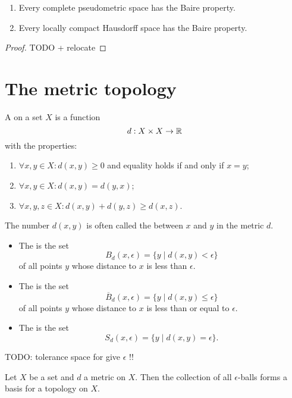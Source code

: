 \begin{theorem} \label{BaireCategory} \hspace{1em}
\begin{enumerate}
\item Every complete pseudometric space has the Baire property.
\item Every locally compact Hausdorff space has the Baire property.
\end{enumerate}
\end{theorem}
\begin{proof}
TODO + relocate
\end{proof}

\section{The metric topology}
\begin{definition}
A  on a set $X$ is a function
\[ d:X\times X \to \mathbb{R} \]
with the properties:
\begin{enumerate}
\item $\forall x,y\in X: d(x,y)\geq 0$ and equality holds \textup{if and only if} $x=y$;
\item $\forall x,y\in X: d(x,y)= d(y,x)$;
\item $\forall x,y,z\in X: d(x,y)+d(y,z)\geq d(x,z)$.
\end{enumerate}
\end{definition}
The number $d(x,y)$ is often called the  between $x$ and $y$ in the metric $d$.
\begin{definition}
\begin{itemize}
\item The  is the set
\[ B_d(x,\epsilon) = \{y\;|\; d(x,y)< \epsilon\} \]
of all points $y$ whose distance to $x$ is less than $\epsilon$.
\item The  is the set
\[ \overline{B}_d(x,\epsilon) = \{y\;|\; d(x,y)\leq \epsilon\} \]
of all points $y$ whose distance to $x$ is less than or equal to $\epsilon$.
\item The  is the set
\[ S_d(x,\epsilon) = \{y\;|\; d(x,y) = \epsilon\}. \]
\end{itemize}
\end{definition}

TODO: tolerance space for give $\epsilon$ !!

\begin{lemma}
Let $X$ be a set and $d$ a metric on $X$. Then the collection of all $\epsilon$-balls forms a basis for a topology on $X$.
\end{lemma}

